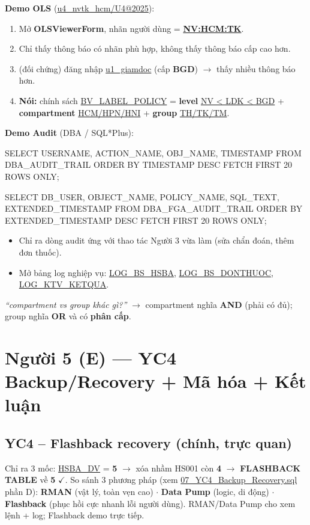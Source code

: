\documentclass[12pt,a4paper]{article}
\DeclareRobustCommand{\code}[1]{\begingroup\urlstyle{tt}\url{#1}\endgroup}
\newcommand{\ra}{$\rightarrow$}
\begin{document}
\noindent\textbf{Demo OLS} (\code{u4_nvtk_hcm/U4@2025}):
\begin{enumerate}
  \item Mở \textbf{OLSViewerForm}, nhãn người dùng = \textbf{\code{NV:HCM:TK}}.
  \item Chỉ thấy thông báo có nhãn phù hợp, không thấy thông báo cấp cao hơn.
  \item (đối chứng) đăng nhập \code{u1_giamdoc} (cấp \textbf{BGD}) \ra{} thấy nhiều thông báo hơn.
  \item \textbf{Nói:} chính sách \code{BV_LABEL_POLICY} = \textbf{level} \code{NV < LDK < BGD} + \textbf{compartment}
    \code{HCM/HPN/HNI} + \textbf{group} \code{TH/TK/TM}.
\end{enumerate}

\noindent\textbf{Demo Audit} (DBA / SQL*Plus):
\begin{Code}
SELECT USERNAME, ACTION_NAME, OBJ_NAME, TIMESTAMP
FROM DBA_AUDIT_TRAIL ORDER BY TIMESTAMP DESC FETCH FIRST 20 ROWS ONLY;

SELECT DB_USER, OBJECT_NAME, POLICY_NAME, SQL_TEXT, EXTENDED_TIMESTAMP
FROM DBA_FGA_AUDIT_TRAIL ORDER BY EXTENDED_TIMESTAMP DESC FETCH FIRST 20 ROWS ONLY;
\end{Code}
\begin{itemize}
  \item Chỉ ra dòng audit ứng với thao tác Người 3 vừa làm (sửa chẩn đoán, thêm đơn thuốc).
  \item Mở bảng log nghiệp vụ: \code{LOG_BS_HSBA}, \code{LOG_BS_DONTHUOC}, \code{LOG_KTV_KETQUA}.
\end{itemize}

\begin{warnbox}[title={Có thể bị hỏi}]
\textit{``compartment vs group khác gì?''} \ra{} compartment nghĩa \textbf{AND} (phải có đủ); group nghĩa
\textbf{OR} và có \textbf{phân cấp}.
\end{warnbox}

\section{Người 5 (E) — YC4 Backup/Recovery + Mã hóa + Kết luận}

\subsection{YC4 -- Flashback recovery (chính, trực quan)}
Chỉ ra 3 mốc: \code{HSBA_DV} = \textbf{5} \ra{} xóa nhầm HS001 còn \textbf{4} \ra{} \textbf{FLASHBACK TABLE}
về \textbf{5} $\checkmark$. So sánh 3 phương pháp (xem \code{07_YC4_Backup_Recovery.sql} phần D): \textbf{RMAN}
(vật lý, toàn vẹn cao) $\cdot$ \textbf{Data Pump} (logic, di động) $\cdot$ \textbf{Flashback} (phục hồi cực nhanh
lỗi người dùng). RMAN/Data Pump cho xem lệnh + log; Flashback demo trực tiếp.
\end{document}

